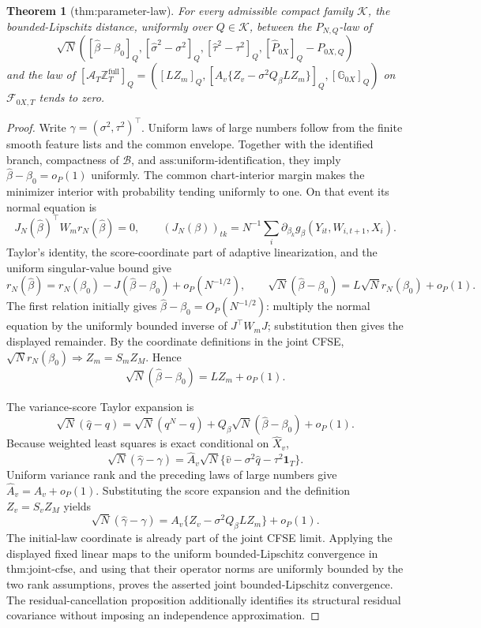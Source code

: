 \documentclass{article}
\newtheorem{theorem}{Theorem}
\begin{document}
\begin{theorem}[thm:parameter-law]\label{thm:parameter-law}
For every admissible compact family \(\mathcal K\), the bounded-Lipschitz distance, uniformly over \(Q\in\mathcal K\), between the \(P_{N,Q}\)-law of \[\sqrt N\left([\widehat\beta-\beta_0]_Q,[\widehat\sigma^2-\sigma^2]_Q,[\widehat\tau^2-\tau^2]_Q,[\widehat P_{0X}]_Q-P_{0X,Q}\right)\] and the law of \([\mathcal A_T\mathbb Z_T^{\mathrm{full}}]_Q=([LZ_m]_Q,[A_v\{Z_v-\sigma^2Q_\beta LZ_m\}]_Q,[\mathbb G_{0X}]_Q)\) on \(\mathcal F_{0X,T}\) tends to zero.
\end{theorem}
\begin{proof}
Write \(\gamma=(\sigma^2,\tau^2)^{\top}\).  Uniform laws of large numbers follow from the finite smooth feature lists and the common envelope.  Together with the identified branch, compactness of \(\mathcal B\), and \(\text{ass:uniform-identification}\), they imply \(\widehat\beta-\beta_0=o_P(1)\) uniformly.  The common chart-interior margin makes the minimizer interior with probability tending uniformly to one.  On that event its normal equation is
\[
 J_N(\widehat\beta)^{\top}W_mr_N(\widehat\beta)=0,
 \qquad (J_N(\beta))_{tk}=N^{-1}\sum_i\partial_{\beta_k}g_\beta(Y_{it},W_{i,t+1},X_i).
\]
Taylor's identity, the score-coordinate part of adaptive linearization, and the uniform singular-value bound give
\[
 r_N(\widehat\beta)=r_N(\beta_0)-J(\widehat\beta-\beta_0)+o_P(N^{-1/2}),
 \qquad
 \sqrt N(\widehat\beta-\beta_0)=L\sqrt N r_N(\beta_0)+o_P(1).
\]
The first relation initially gives \(\widehat\beta-\beta_0=O_P(N^{-1/2})\): multiply the normal equation by the uniformly bounded inverse of \(J^{\top}W_mJ\); substitution then gives the displayed remainder.  By the coordinate definitions in the joint CFSE, \(\sqrt Nr_N(\beta_0)\Rightarrow Z_m=S_mZ_M\).  Hence
\[
 \sqrt N(\widehat\beta-\beta_0)=LZ_m+o_P(1).
\]

The variance-score Taylor expansion is
\[
 \sqrt N(\widehat q-q)=\sqrt N(q^N-q)+Q_\beta\sqrt N(\widehat\beta-\beta_0)+o_P(1).
\]
Because weighted least squares is exact conditional on \(\widehat X_v\),
\[
 \sqrt N(\widehat\gamma-\gamma)
 =\widehat A_v\sqrt N\{\widehat v-\sigma^2\widehat q-\tau^2\mathbf1_T\}.
\]
Uniform variance rank and the preceding laws of large numbers give \(\widehat A_v=A_v+o_P(1)\).  Substituting the score expansion and the definition \(Z_v=S_vZ_M\) yields
\[
 \sqrt N(\widehat\gamma-\gamma)
 =A_v\{Z_v-\sigma^2Q_\beta LZ_m\}+o_P(1).
\]
The initial-law coordinate is already part of the joint CFSE limit.  Applying the displayed fixed linear maps to the uniform bounded-Lipschitz convergence in \(\text{thm:joint-cfse}\), and using that their operator norms are uniformly bounded by the two rank assumptions, proves the asserted joint bounded-Lipschitz convergence.  The residual-cancellation proposition additionally identifies its structural residual covariance without imposing an independence approximation.
\end{proof}
\end{document}
